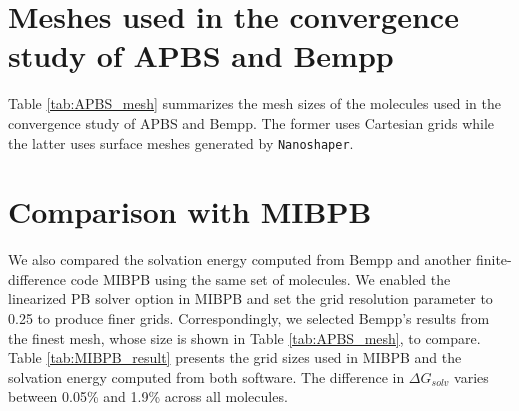 \small{
\section{Meshes used in the convergence study of APBS and Bempp}\label{sec:apbs_mesh}
Table \ref{tab:APBS_mesh} summarizes the mesh sizes of the molecules used in the convergence study of APBS and Bempp.
The former uses Cartesian grids while the latter uses surface meshes generated by \texttt{Nanoshaper}.

\begin{table}[]
    \centering
    \caption{Mesh sizes of the molecules used in the convergence study of APBS and Bempp.}
    \label{tab:APBS_mesh}
\end{table}

\section{Comparison with MIBPB}\label{sec:comp_mibpb}
We also compared the solvation energy computed from Bempp and another finite-difference code MIBPB using the same set of molecules.
We enabled the linearized PB solver option in MIBPB and set the grid resolution parameter to 0.25 to produce finer grids.
Correspondingly, we selected Bempp's results from the finest mesh, whose size is shown in Table \ref{tab:APBS_mesh}, to compare.
Table \ref{tab:MIBPB_result} presents the grid sizes used in MIBPB and the solvation energy computed from both software.
The difference in $\Delta G_{solv}$ varies between 0.05\% and 1.9\% across all molecules.

}
